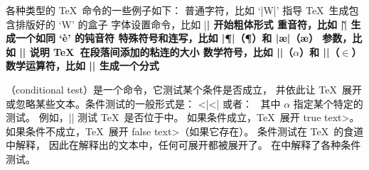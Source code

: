 {%
各种类型的 \TeX\ 命令的一些例子如下：
\ulist\compact
\li 普通字符，比如 `|W|' 指导 \TeX\ 生成包含排版好的 `W' 的盒子
\li 字体设置命令，比如 |\bf| 开始粗体形式
\li 重音符，比如 |\`| 生成一个如同 `\`e' 的钝音符
\li 特殊符号和连写，比如 |\P|（\P ）和 |\ae|（\ae ）
\li 参数，比如 |\parskip| 说明 \TeX\ 在段落间添加的粘连的大小
\li 数学符号，比如 |\alpha|（$\alpha$）和 |\in|（$\in$）
\li 数学运算符，比如 |\over| 生成一个分式
\endulist
\endconcept



%
{}（conditional test）是一个命令，它测试某个条件是否成立，
并依此让 \TeX\ 展开或忽略某些文本。条件测试的一般形式是：
^^|\else|^^|\fi|
\noindent 或者：\hfil\
\noindent 其中 $\alpha$ 指定某个特定的测试。
例如，|\ifvmode| 测试 \TeX\ 是否位于中。
如果条件成立，\TeX\ 展开 \<true text>。
如果条件不成立，\TeX\ 展开 \<false text>（如果它存在）。
条件测试在 \TeX\ 的食道\seeconcept{\texpouxi}中解释，
因此在解释出的文本中，任何可展开都被展开了。
在中解释了各种条件测试。
\endconcept


}
